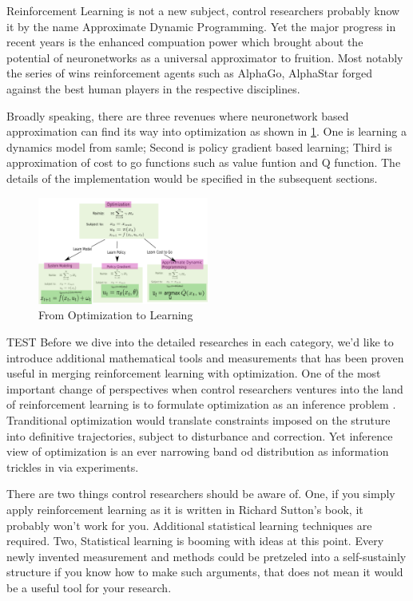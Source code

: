 \documentclass[journal]{IEEEtran}
\begin{document}
Reinforcement Learning is not a new subject, control researchers probably know it by the name Approximate Dynamic Programming. Yet the major progress in recent years is the enhanced compuation power which brought about the potential of neuronetworks as a universal approximator \cite{Hornik1991ApproximationCO} to fruition. Most notably the series of wins reinforcement agents such as AlphaGo, AlphaStar forged against the best human players in the respective disciplines.

Broadly speaking, there are three revenues where neuronetwork based approximation can find its way into optimization as shown in \ref{fig:1}. One is learning a dynamics model from samle; Second is policy gradient based learning; Third is approximation of cost to go functions such as value funtion and Q function. The details of the implementation would be specified in the subsequent sections.

\begin{figure}[H]
    \centering
    \includegraphics[width=0.5\textwidth]{Control.png}
    \caption{From Optimization to Learning}
    \label{fig:1}
\end{figure}
TEST
Before we dive into the detailed researches in each category, we'd like to introduce additional mathematical tools and measurements that has been proven useful in merging reinforcement learning with optimization. One of the most important change of perspectives when control researchers ventures into the land of reinforcement learning is to formulate optimization as an inference problem \cite{Levine2018ReinforcementLA}. Tranditional optimization would translate constraints imposed on the struture into definitive trajectories, subject to disturbance and correction. Yet inference view of optimization is an ever narrowing band od distribution as information trickles in via experiments.

There are two things control researchers should be aware of. One, if you simply apply reinforcement learning as it is written in Richard Sutton's book, it probably won't work for you. Additional statistical learning techniques are required. Two, Statistical learning is booming with ideas at this point. Every newly invented measurement and methods could be pretzeled into a self-sustainly structure if you know how to make such arguments, that does not mean it would be a useful tool for your research.
\end{document}
